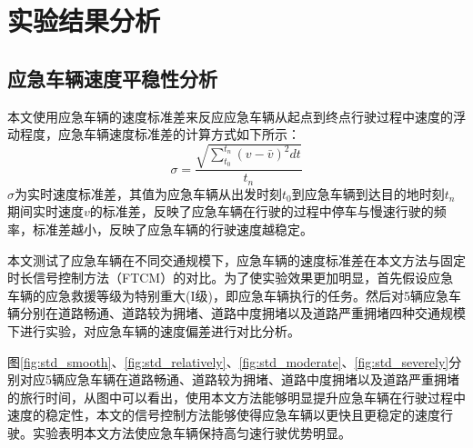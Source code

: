 



\section{实验结果分析}
\subsection{应急车辆速度平稳性分析}
本文使用应急车辆的速度标准差来反应应急车辆从起点到终点行驶过程中速度的浮动程度，应急车辆速度标准差的计算方式如下所示：
\begin{equation}
	\label{equation:sigma}
	\sigma = \dfrac{\sqrt{\sum_{t_0}^{t_n} (v-\bar{v})^2 dt}}{t_n}
\end{equation}
${\sigma}$为实时速度标准差，其值为应急车辆从出发时刻${t_0}$到应急车辆到达目的地时刻${t_n}$期间实时速度${v}$的标准差，反映了应急车辆在行驶的过程中停车与慢速行驶的频率，标准差越小，反映了应急车辆的行驶速度越稳定。

本文测试了应急车辆在不同交通规模下，应急车辆的速度标准差在本文方法与固定时长信号控制方法（FTCM）的对比。为了使实验效果更加明显，首先假设应急车辆的应急救援等级为特别重大(I级)，即应急车辆执行的任务。然后对5辆应急车辆分别在道路畅通、道路较为拥堵、道路中度拥堵以及道路严重拥堵四种交通规模下进行实验，对应急车辆的速度偏差进行对比分析。


图\ref{fig:std_smooth}、\ref{fig:std_relatively}、\ref{fig:std_moderate}、\ref{fig:std_severely}分别对应5辆应急车辆在道路畅通、道路较为拥堵、道路中度拥堵以及道路严重拥堵的旅行时间，从图中可以看出，使用本文方法能够明显提升应急车辆在行驶过程中速度的稳定性，本文的信号控制方法能够使得应急车辆以更快且更稳定的速度行驶。实验表明本文方法使应急车辆保持高匀速行驶优势明显。

